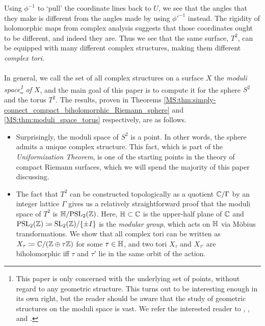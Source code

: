 \documentclass[../Moduli_Spaces_of_Riemann_Surfaces.tex]{subfiles}
\begin{document}
    Using $\phi^{-1}$ to `pull' the coordinate lines back to $U$, we see that the angles that they make is different from the angles made by using $\phi'^{-1}$ instead. The rigidity of holomorphic maps from complex analysis suggests that those coordinates ought to be different, and indeed they are. Thus we see that the same surface, $T^2$, can be equipped with many different complex structures, making them different \textit{complex tori}.\\\ \\
    In general, we call the set of all complex structures on a surface $X$ the \textit{moduli space\footnote{This paper is only concerned with the underlying set of points, without regard to any geometric structure. This turns out to be interesting enough in its own right, but the reader should be aware that the study of geometric structures on the moduli space is vast. We refer the interested reader to \cite{i&t}, \cite{farb}, and \cite{hubbard}.} of $X$}, and the main goal of this paper is to compute it for the sphere $S^2$ and the torus $T^2$. The results, proven in Theorems \ref{MS:thm:simply-connect_compact_biholomorphic_Riemann_sphere} and \ref{MS:thm:moduli_space_torus} respectively, are as follows.
    \begin{itemize}
        \item Surprisingly, the moduli space of $S^2$ is a point. In other words, the sphere admits a unique complex structure. This fact, which is part of the \textit{Uniformization Theorem}, is one of the starting points in the theory of compact Riemann surfaces, which we will spend the majority of this paper discussing.
            \vspace{-0.05in}
        \item The fact that $T^2$ can be constructed topologically as a quotient $\mathbb{C}/\Gamma$ by an integer lattice $\Gamma$ gives us a relatively straightforward proof that the moduli space of $T^2$ is $\mathbb{H}/\!\operatorname{PSL}_{2}\!\left(\mathbb{Z}\right)$. Here, $\mathbb{H}\subset\mathbb{C}$ is the upper-half plane of $\mathbb{C}$ and $\operatorname{PSL}_{2}\!\left(\mathbb{Z}\right)\coloneqq\operatorname{SL}_2\!\left(\mathbb{Z}\right)\!/\!\left\{\pm I\right\}$ is the \textit{modular group}, which acts on $\mathbb{H}$ via Möbius transformations. We show that all complex tori can be written as $X_\tau\coloneqq\mathbb{C}/\!\left(\mathbb{Z}\oplus\tau\mathbb{Z}\right)$ for some $\tau\in\mathbb{H}$, and two tori $X_\tau$ and $X_{\tau'}$ are biholomorphic iff $\tau$ and $\tau'$ lie in the same orbit of the action.
    \end{itemize}
\end{document}
